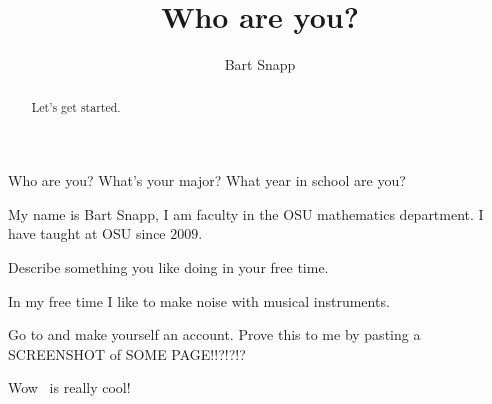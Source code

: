\documentclass{ximera}
\title{Who are you?}
\author{Bart Snapp}
\begin{document}
\begin{abstract}
  Let's get started.
\end{abstract}
\maketitle

\begin{question}
  Who are you? What's your major? What year in school are you?
  \begin{freeResponse}
    My name is Bart Snapp, I am faculty in the OSU mathematics department. I have taught at OSU since $2009$.
  \end{freeResponse}
\end{question}

\begin{question}
  Describe something you like doing in your free time.
  \begin{freeResponse}
    In my free time I like to make noise with musical instruments.
  \end{freeResponse}
\end{question}


\begin{question}
  Go to \flavor and make yourself an account. Prove this to me by pasting a SCREENSHOT of SOME PAGE!!?!?!?
  \begin{freeResponse}
    Wow \snap\ is really cool!
  \end{freeResponse}
\end{question}
\end{document}
